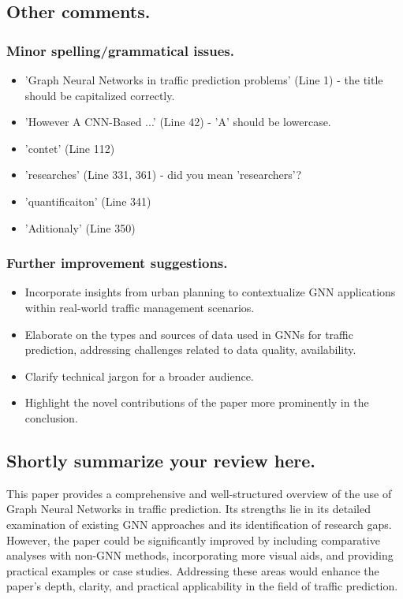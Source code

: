 \documentclass[12pt]{article}
\begin{document}
\subsection*{Other comments.}
\subsubsection*{Minor spelling/grammatical issues.}
\begin{itemize}
    \item 'Graph Neural Networks in traffic prediction problems' (Line 1) - the title should be capitalized correctly.
    \item 'However A CNN-Based ...' (Line 42) - 'A' should be lowercase.
    \item 'contet' (Line 112) 
    \item 'researches' (Line 331, 361) - did you mean 'researchers'?
    \item 'quantificaiton' (Line 341)
    \item 'Aditionaly' (Line 350)
\end{itemize}

\subsubsection*{Further improvement suggestions.}
\begin{itemize}
    \item Incorporate insights from urban planning to contextualize GNN applications within real-world traffic management scenarios.
    \item Elaborate on the types and sources of data used in GNNs for traffic prediction, addressing challenges related to data quality, availability.
    \item Clarify technical jargon for a broader audience.
    \item Highlight the novel contributions of the paper more prominently in the conclusion.
\end{itemize}

\subsection*{Shortly summarize your review here.}
This paper provides a comprehensive and well-structured overview of the use of Graph Neural Networks in traffic prediction. 
Its strengths lie in its detailed examination of existing GNN approaches and its identification of research gaps. However, the paper could be significantly improved by including comparative analyses with non-GNN methods, incorporating more visual aids, and providing practical examples or case studies. Addressing these areas would enhance the paper's depth, clarity, and practical applicability in the field of traffic prediction.
\end{document}
